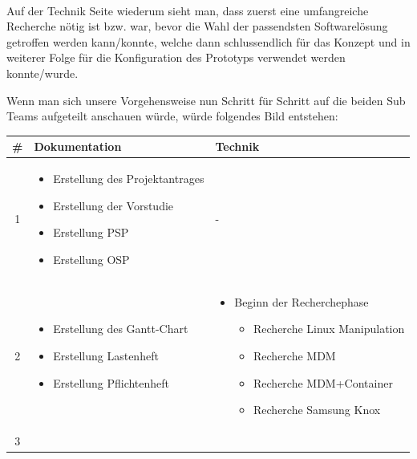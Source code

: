 \paragraph*{}
Auf der Technik Seite wiederum sieht man, dass zuerst eine umfangreiche Recherche nötig ist bzw. war, bevor die Wahl der passendsten Softwarelösung getroffen werden kann/konnte, welche dann schlussendlich für das Konzept und in weiterer Folge für die Konfiguration des Prototyps verwendet werden konnte/wurde.


\newpage
Wenn man sich unsere Vorgehensweise nun Schritt für Schritt auf die beiden Sub Teams aufgeteilt anschauen würde, würde folgendes Bild entstehen:

\begin{table}
	\begin{tabular}{| c | p{6.5cm} | p{7.5cm} |}
		\hline
		\textbf \# & \textbf{Dokumentation} & \textbf{Technik}
		\\\hline %
		1 
		&%
		\begin{itemize}
			\item Erstellung des Projektantrages
			\item Erstellung der Vorstudie
			\item Erstellung PSP
			\item Erstellung OSP
		\end{itemize}
		&%
		-
		\\\hline %
		2
		&%
		\begin{itemize}
			\item Erstellung des Gantt-Chart
			\item Erstellung Lastenheft
			\item Erstellung Pflichtenheft
		\end{itemize}
		&%
		\begin{itemize}
			\item Beginn der Recherchephase
			\begin{itemize}
				\item Recherche Linux Manipulation
				\item Recherche MDM
				\item Recherche MDM+Container
				\item Recherche Samsung Knox
			\end{itemize}
		\end{itemize}
		\\\hline %
		3
		&%
		\begin{itemize}

\end{itemize}
\end{tabular}
\end{table}
